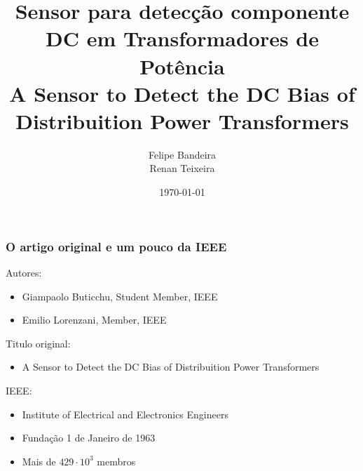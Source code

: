 \documentclass{beamer}
\title[Sensor para detecção componente DC]{Sensor para detecção componente DC em Transformadores de Potência\\\small{A Sensor to Detect the DC Bias of Distribuition Power Transformers}} %
\author{Felipe Bandeira\\Renan Teixeira} %
\institute[Unifor] %
{
Universidade de Fortaleza-UNIFOR\\%
\medskip
}
\date{\today} %
\begin{document}
\begin{frame}
\titlepage %
\end{frame}



\begin{frame}
    \frametitle{O artigo original e um pouco da IEEE}

    Autores:
    \begin{itemize}
        \item Giampaolo Buticchu, Student Member, IEEE
        \item Emilio Lorenzani, Member, IEEE
    \end{itemize}
    Titulo original:
    \begin{itemize}
        \item A Sensor to Detect the DC Bias of Distribuition Power Transformers
    \end{itemize}

    IEEE:
    \begin{itemize}
        \item Institute of Electrical and Electronics Engineers
        \item Fundação 1 de Janeiro de 1963
        \item Mais de $429 \cdot 10^3 $ membros
    \end{itemize}
\end{frame}
\end{document}
